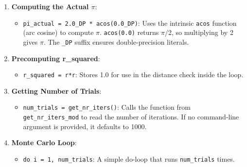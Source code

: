 \begin{enumerate}
\begin{itemize}
\item \texttt{real(kind=DP) :: x = 0.0, y = 0.0, r = 1.0}: Coordinates and radius:

\begin{itemize}
\item \texttt{x}, \texttt{y}: Pseudo-random coordinates in [0,1).
\item \texttt{r}: Radius of the circle (fixed at 1.0 for a unit circle).
\end{itemize}


\item \texttt{real(kind=DP) :: r\_squared = 0.0}: Precomputed \texttt{r*r} (1.0) to avoid repeated multiplication in the loop for minor efficiency.
\end{itemize}


\item \textbf{Computing the Actual $\pi$}:

\begin{itemize}
\item \texttt{pi\_actual = 2.0\_DP * acos(0.0\_DP)}: Uses the intrinsic \texttt{acos} function (arc cosine) to compute $\pi$. \texttt{acos(0.0)} returns $\pi$/2, so multiplying by 2 gives $\pi$. The \texttt{\_DP} suffix ensures double-precision literals.
\end{itemize}


\item \textbf{Precomputing r\_squared}:

\begin{itemize}
\item \texttt{r\_squared = r*r}: Stores 1.0 for use in the distance check inside the loop.
\end{itemize}


\item \textbf{Getting Number of Trials}:

\begin{itemize}
\item \texttt{num\_trials = get\_nr\_iters()}: Calls the function from \texttt{get\_nr\_iters\_mod} to read the number of iterations. If no command-line argument is provided, it defaults to 1000.
\end{itemize}


\item \textbf{Monte Carlo Loop}:

\begin{itemize}
\item \texttt{do i = 1, num\_trials}: A simple do-loop that runs \texttt{num\_trials} times.


\end{itemize}
\end{enumerate}
